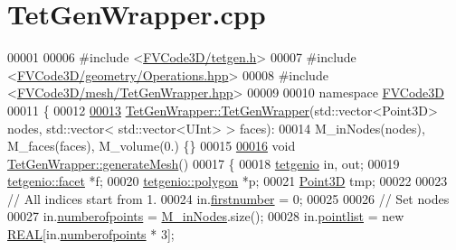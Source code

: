\hypertarget{TetGenWrapper_8cpp_source}{}\section{Tet\+Gen\+Wrapper.\+cpp}
\label{TetGenWrapper_8cpp_source}

\begin{DoxyCode}
00001 
00006 \textcolor{preprocessor}{#include <\hyperlink{tetgen_8h}{FVCode3D/tetgen.h}>}
00007 \textcolor{preprocessor}{#include <\hyperlink{Operations_8hpp}{FVCode3D/geometry/Operations.hpp}>}
00008 \textcolor{preprocessor}{#include <\hyperlink{TetGenWrapper_8hpp}{FVCode3D/mesh/TetGenWrapper.hpp}>}
00009 
00010 \textcolor{keyword}{namespace }\hyperlink{namespaceFVCode3D}{FVCode3D}
00011 \{
00012 
\hypertarget{TetGenWrapper_8cpp_source.tex_l00013}{}\hyperlink{classFVCode3D_1_1TetGenWrapper_adf67f9b1994b718a65f36724d42e65b0}{00013} \hyperlink{classFVCode3D_1_1TetGenWrapper_ac89da37a0ce92c84ab8c74829031192e}{TetGenWrapper::TetGenWrapper}(std::vector<Point3D> nodes, std::vector< 
      std::vector<UInt> > faces):
00014     M\_inNodes(nodes), M\_faces(faces), M\_volume(0.) \{\}
00015 
\hypertarget{TetGenWrapper_8cpp_source.tex_l00016}{}\hyperlink{classFVCode3D_1_1TetGenWrapper_ad2965002885016bd26494629af54ce97}{00016} \textcolor{keywordtype}{void} \hyperlink{classFVCode3D_1_1TetGenWrapper_ad2965002885016bd26494629af54ce97}{TetGenWrapper::generateMesh}()
00017 \{
00018     \hyperlink{classtetgenio}{tetgenio} in, out;
00019     \hyperlink{structtetgenio_1_1facet}{tetgenio::facet} *f;
00020     \hyperlink{structtetgenio_1_1polygon}{tetgenio::polygon} *p;
00021     \hyperlink{classFVCode3D_1_1Point3D}{Point3D} tmp;
00022 
00023     \textcolor{comment}{// All indices start from 1.}
00024     in.\hyperlink{classtetgenio_ace3ae3f90741f8e51e02f5007d81e440}{firstnumber} = 0;
00025 
00026     \textcolor{comment}{// Set nodes}
00027     in.\hyperlink{classtetgenio_a5211bec795ba870c01fadade4cd8670f}{numberofpoints} = \hyperlink{classFVCode3D_1_1TetGenWrapper_ae0637911dffc55fc74b5414fc6e8e417}{M\_inNodes}.size();
00028     in.\hyperlink{classtetgenio_a69b1e0f645f57281d838569c2bbc5789}{pointlist} = \textcolor{keyword}{new} \hyperlink{tetgen_8h_a4b654506f18b8bfd61ad2a29a7e38c25}{REAL}[in.\hyperlink{classtetgenio_a5211bec795ba870c01fadade4cd8670f}{numberofpoints} * 3];

\end{DoxyCode}
